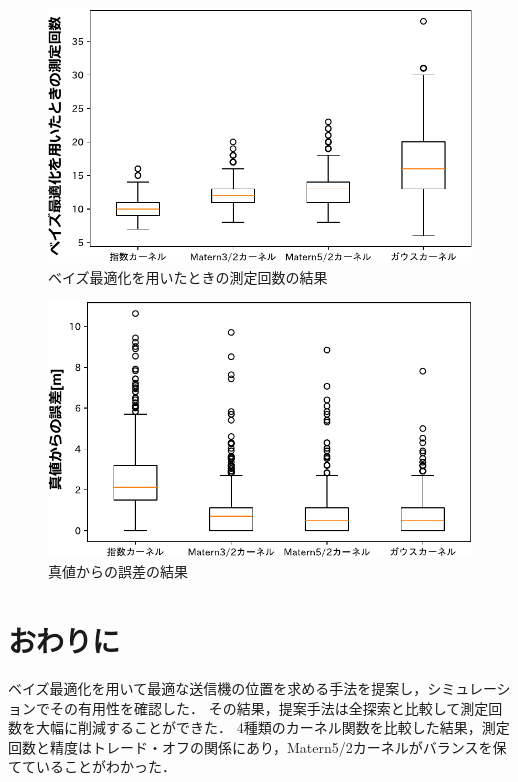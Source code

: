 \documentclass[twocolumn]{ltjarticle}
\begin{document}
\setlength\intextsep{3pt}
\setlength\textfloatsep{3pt}
\begin{figure}[H]
	\centering
	\includegraphics[width=0.9\linewidth]{./figures/material_8_count_box.pdf}
	\vspace*{-0.4cm}
	\caption{ベイズ最適化を用いたときの測定回数の結果} \label{fig:result_count}
\end{figure}
\vspace*{-0.1cm}
\begin{figure}[H]
	\centering
	\includegraphics[width=0.9\linewidth]{./figures/material_8_distance_box.pdf}
	\vspace*{-0.4cm}
	\caption{真値からの誤差の結果} \label{fig:result_error}
\end{figure}

\section{おわりに}

ベイズ最適化を用いて最適な送信機の位置を求める手法を提案し，シミュレーションでその有用性を確認した．
その結果，提案手法は全探索と比較して測定回数を大幅に削減することができた．
4種類のカーネル関数を比較した結果，測定回数と精度はトレード・オフの関係にあり，Matern5/2カーネルがバランスを保てていることがわかった．
\printbibliography[title=参考文献]
\end{document}
